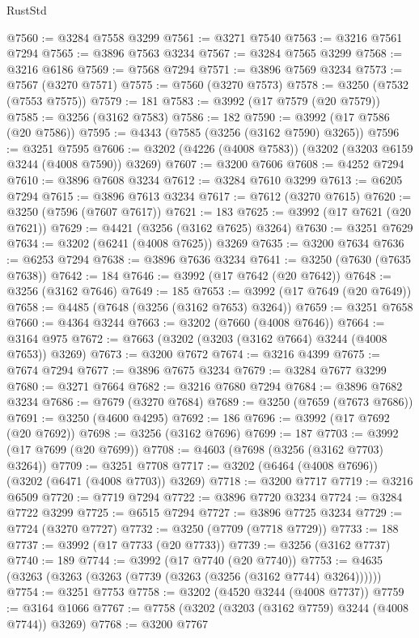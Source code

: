 \begin{lexlean}{RustStd}
\begin{coremodule}
@7560 := @3284 @7558 @3299
@7561 := @3271 @7540
@7563 := @3216 @7561 @7294
@7565 := @3896 @7563 @3234
@7567 := @3284 @7565 @3299
@7568 := @3216 @6186
@7569 := @7568 @7294
@7571 := @3896 @7569 @3234
@7573 := @7567 (@3270 @7571)
@7575 := @7560 (@3270 @7573)
@7578 := @3250 (@7532 (@7553 @7575))
@7579 := 181
@7583 := @3992 (@17 @7579 (@20 @7579))
@7585 := @3256 (@3162 @7583)
@7586 := 182
@7590 := @3992 (@17 @7586 (@20 @7586))
@7595 := @4343 (@7585 (@3256 (@3162 @7590) @3265))
@7596 := @3251 @7595
@7606 := @3202 (@4226 (@4008 @7583)) (@3202 (@3203 @6159 @3244 (@4008 @7590)) @3269)
@7607 := @3200 @7606
@7608 := @4252 @7294
@7610 := @3896 @7608 @3234
@7612 := @3284 @7610 @3299
@7613 := @6205 @7294
@7615 := @3896 @7613 @3234
@7617 := @7612 (@3270 @7615)
@7620 := @3250 (@7596 (@7607 @7617))
@7621 := 183
@7625 := @3992 (@17 @7621 (@20 @7621))
@7629 := @4421 (@3256 (@3162 @7625) @3264)
@7630 := @3251 @7629
@7634 := @3202 (@6241 (@4008 @7625)) @3269
@7635 := @3200 @7634
@7636 := @6253 @7294
@7638 := @3896 @7636 @3234
@7641 := @3250 (@7630 (@7635 @7638))
@7642 := 184
@7646 := @3992 (@17 @7642 (@20 @7642))
@7648 := @3256 (@3162 @7646)
@7649 := 185
@7653 := @3992 (@17 @7649 (@20 @7649))
@7658 := @4485 (@7648 (@3256 (@3162 @7653) @3264))
@7659 := @3251 @7658
@7660 := @4364 @3244
@7663 := @3202 (@7660 (@4008 @7646))
@7664 := @3164 @975
@7672 := @7663 (@3202 (@3203 (@3162 @7664) @3244 (@4008 @7653)) @3269)
@7673 := @3200 @7672
@7674 := @3216 @4399
@7675 := @7674 @7294
@7677 := @3896 @7675 @3234
@7679 := @3284 @7677 @3299
@7680 := @3271 @7664
@7682 := @3216 @7680 @7294
@7684 := @3896 @7682 @3234
@7686 := @7679 (@3270 @7684)
@7689 := @3250 (@7659 (@7673 @7686))
@7691 := @3250 (@4600 @4295)
@7692 := 186
@7696 := @3992 (@17 @7692 (@20 @7692))
@7698 := @3256 (@3162 @7696)
@7699 := 187
@7703 := @3992 (@17 @7699 (@20 @7699))
@7708 := @4603 (@7698 (@3256 (@3162 @7703) @3264))
@7709 := @3251 @7708
@7717 := @3202 (@6464 (@4008 @7696)) (@3202 (@6471 (@4008 @7703)) @3269)
@7718 := @3200 @7717
@7719 := @3216 @6509
@7720 := @7719 @7294
@7722 := @3896 @7720 @3234
@7724 := @3284 @7722 @3299
@7725 := @6515 @7294
@7727 := @3896 @7725 @3234
@7729 := @7724 (@3270 @7727)
@7732 := @3250 (@7709 (@7718 @7729))
@7733 := 188
@7737 := @3992 (@17 @7733 (@20 @7733))
@7739 := @3256 (@3162 @7737)
@7740 := 189
@7744 := @3992 (@17 @7740 (@20 @7740))
@7753 := @4635 (@3263 (@3263 (@3263 (@7739 (@3263 (@3256 (@3162 @7744) @3264))))))
@7754 := @3251 @7753
@7758 := @3202 (@4520 @3244 (@4008 @7737))
@7759 := @3164 @1066
@7767 := @7758 (@3202 (@3203 (@3162 @7759) @3244 (@4008 @7744)) @3269)
@7768 := @3200 @7767

\end{coremodule}
\end{lexlean}
